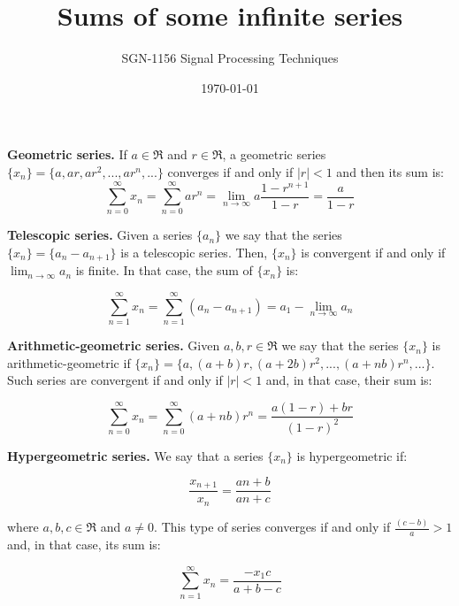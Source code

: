 \documentclass[a4paper,11pt,oneside]{article}
\title{Sums of some infinite series}
\author{SGN-1156 Signal Processing Techniques
}
\date{\today}
\begin{document}
\maketitle

\noindent\textbf{Geometric series.} If $a\in\Re$ and $r\in\Re$, a geometric series $\{x_{n}\} = \{a,ar,ar^2,...,ar^n,...\}$ converges if and only if $|r|<1$ and then its sum is:
\begin{equation} \sum_{n=0}^{\infty}x_{n}=\sum_{n=0}^{\infty}ar^{n}=\lim_{n\rightarrow\infty} a\frac{1-r^{n+1}}{1-r}=\frac{a}{1-r}
\end{equation}

\vspace{1cm}

\noindent\textbf{Telescopic series.} Given a series $\{a_{n}\}$ we say that the series $\{x_{n}\}=\{a_{n}-a_{n+1}\}$ is a telescopic series. Then, $\{x_{n}\}$ is convergent if and only if $\lim_{n\rightarrow\infty}a_{n}$ is finite. In that case, the sum of $\{x_{n}\}$ is:

\begin{equation}
\sum_{n=1}^{\infty}x_{n} = \sum_{n=1}^{\infty}\left(a_{n}-a_{n+1}\right)=a_1-\lim_{n\rightarrow\infty}a_{n}
\end{equation}

\vspace{1cm}

\noindent\textbf{Arithmetic-geometric series.} Given $a,b,r\in\Re$ we say that the series $\{x_{n}\}$ is arithmetic-geometric if $\{x_{n}\}=\{a,(a+b)r,(a+2b)r^2,...,(a+nb)r^n,...\}$. Such series are convergent if and only if $|r|<1$ and, in that case, their sum is:

\begin{equation}
\sum_{n=0}^{\infty}x_{n}=\sum_{n=0}^{\infty}(a+nb)r^n=\frac{a(1-r)+br}{(1-r)^2}
\end{equation}

\vspace{1cm}

\noindent\textbf{Hypergeometric series.} We say that a series $\{x_n\}$ is hypergeometric if:

\begin{equation}
\frac{x_{n+1}}{x_n}=\frac{an+b}{an+c}
\end{equation}

\noindent where $a,b,c\in\Re$ and $a\neq 0$. This type of series converges if and only if $\frac{(c-b)}{a}>1$ and, in that case, its sum is:

\begin{equation}
\sum_{n=1}^{\infty}x_{n}=\frac{-x_{1}c}{a+b-c}
\end{equation}
\end{document}
